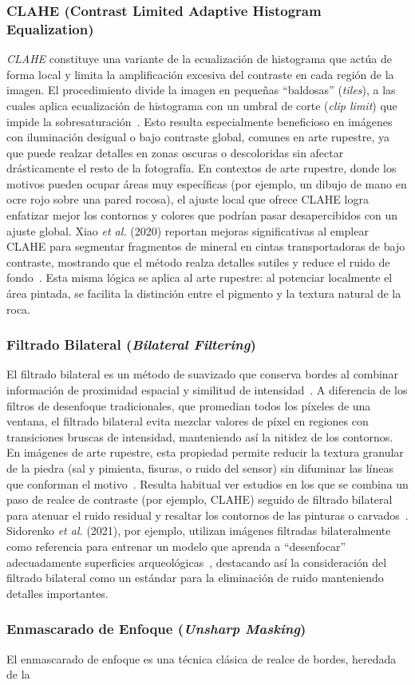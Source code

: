 \subsubsection{CLAHE (Contrast Limited Adaptive Histogram Equalization)} \textit{CLAHE} constituye una variante de la ecualización de histograma que actúa de forma local y limita la amplificación excesiva del contraste en cada región de la imagen. El procedimiento divide la imagen en pequeñas “baldosas” (\textit{tiles}), a las cuales aplica ecualización de histograma con un umbral de corte (\textit{clip limit}) que impide la sobresaturación~\cite{xiao2020}. Esto resulta especialmente beneficioso en imágenes con iluminación desigual o bajo contraste global, comunes en arte rupestre, ya que puede realzar detalles en zonas oscuras o descoloridas sin afectar drásticamente el resto de la fotografía. En contextos de arte rupestre, donde los motivos pueden ocupar áreas muy específicas (por ejemplo, un dibujo de mano en ocre rojo sobre una pared rocosa), el ajuste local que ofrece CLAHE logra enfatizar mejor los contornos y colores que podrían pasar desapercibidos con un ajuste global. Xiao \textit{et al.} (2020) reportan mejoras significativas al emplear CLAHE para segmentar fragmentos de mineral en cintas transportadoras de bajo contraste, mostrando que el método realza detalles sutiles y reduce el ruido de fondo~\cite{xiao2020}. Esta misma lógica se aplica al arte rupestre: al potenciar localmente el área pintada, se facilita la distinción entre el pigmento y la textura natural de la roca. \subsubsection{Filtrado Bilateral (\textit{Bilateral Filtering})} El filtrado bilateral es un método de suavizado que conserva bordes al combinar información de proximidad espacial y similitud de intensidad~\cite{paris2008,sidorenko2021}. A diferencia de los filtros de desenfoque tradicionales, que promedian todos los píxeles de una ventana, el filtrado bilateral evita mezclar valores de píxel en regiones con transiciones bruscas de intensidad, manteniendo así la nitidez de los contornos. En imágenes de arte rupestre, esta propiedad permite reducir la textura granular de la piedra (sal y pimienta, fisuras, o ruido del sensor) sin difuminar las líneas que conforman el motivo~\cite{xiao2020}. Resulta habitual ver estudios en los que se combina un paso de realce de contraste (por ejemplo, CLAHE) seguido de filtrado bilateral para atenuar el ruido residual y resaltar los contornos de las pinturas o carvados~\cite{li2022}. Sidorenko \textit{et al.} (2021), por ejemplo, utilizan imágenes filtradas bilateralmente como referencia para entrenar un modelo que aprenda a “desenfocar” adecuadamente superficies arqueológicas~\cite{sidorenko2021}, destacando así la consideración del filtrado bilateral como un estándar para la eliminación de ruido manteniendo detalles importantes. \subsubsection{Enmascarado de Enfoque (\textit{Unsharp Masking})} El enmascarado de enfoque es una técnica clásica de realce de bordes, heredada de la 